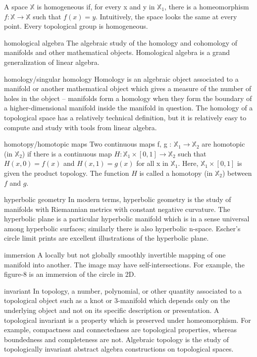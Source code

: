 \begin{description}
\begin{tiny}
\item[] A space $\mathbb{X}$ is homogeneous if, for every x and y in $\mathbb{X}_{1}$, there is a homeomorphism $f : \mathbb{X}  \rightarrow \mathbb{X}$ such that $f(x) = y$. Intuitively, the space looks the same at every point. Every topological group is homogeneous.
\item[homological algebra] The algebraic study of the homology and cohomology of manifolds and other mathematical objects. Homological algebra is a grand generalization of linear algebra.
\item[homology/singular homology] Homology is an algebraic object associated to a manifold or another mathematical object which gives a measure of the number of holes in the object -- manifolds form a homology when they form the boundary of a higher-dimensional manifold inside the manifold in question. The homology of a topological space has a relatively technical definition, but it is relatively easy to compute and study with tools from linear algebra.
\item[homotopy/homotopic maps] Two continuous maps f, g : $\mathbb{X}_{1} \rightarrow \mathbb{X}_{2}$ are homotopic (in $\mathbb{X}_{2}$) if there is a continuous map $H : \mathbb{X}_{1} \times [0, 1] \rightarrow \mathbb{X}_{2}$ such that $H(x, 0) = f(x)$ and $H(x, 1) = g(x)$ for all x in $\mathbb{X}_{1}$. Here, $\mathbb{X}_{1} \times [0, 1]$ is given the product topology. The function $H$ is called a homotopy (in $\mathbb{X}_{2}$) between $f$ and $g$.
\item[hyperbolic geometry] In modern terms, hyperbolic geometry is the study of manifolds with Riemannian metrics with constant negative curvature. The hyperbolic plane is a particular hyperbolic manifold which is in a sense universal among hyperbolic surfaces; similarly there is also hyperbolic n-space. Escher's circle limit prints are excellent illustrations of the hyperbolic plane.
\item[immersion] A locally but not globally smoothly invertible mapping of one manifold into another. The image may have self-intersections. For example, the figure-8 is an immersion of the circle in 2D.
\item[invariant] In topology, a number, polynomial, or other quantity associated to a topological object such as a knot or 3-manifold which depends only on the underlying object and not on its specific description or presentation.
A topological invariant is a property which is preserved under homeomorphism. For example, compactness and connectedness are topological properties, whereas boundedness and completeness are not. Algebraic topology is the study of topologically invariant abstract algebra constructions on topological spaces.

\end{tiny}
\end{description}
